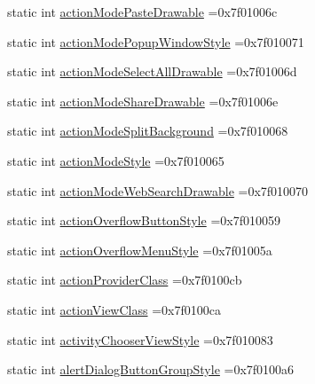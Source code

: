 \begin{DoxyCompactItemize}
static int \hyperlink{classandroid_1_1support_1_1v7_1_1cardview_1_1R_1_1attr_ac766dac9eccbe79b90d7776b8f7c2b26}{action\+Mode\+Paste\+Drawable} =0x7f01006c
\item 
static int \hyperlink{classandroid_1_1support_1_1v7_1_1cardview_1_1R_1_1attr_a5b58730faf2ff2f5aba8da289ef2570b}{action\+Mode\+Popup\+Window\+Style} =0x7f010071
\item 
static int \hyperlink{classandroid_1_1support_1_1v7_1_1cardview_1_1R_1_1attr_a3fe0b7c91a38d7caf797cc0211079d06}{action\+Mode\+Select\+All\+Drawable} =0x7f01006d
\item 
static int \hyperlink{classandroid_1_1support_1_1v7_1_1cardview_1_1R_1_1attr_aa3b0c2c648267047d5c788a1203d3e2f}{action\+Mode\+Share\+Drawable} =0x7f01006e
\item 
static int \hyperlink{classandroid_1_1support_1_1v7_1_1cardview_1_1R_1_1attr_aa4274d8662f21f4ce9f787ee5bfd927a}{action\+Mode\+Split\+Background} =0x7f010068
\item 
static int \hyperlink{classandroid_1_1support_1_1v7_1_1cardview_1_1R_1_1attr_acd95c50299a613cf031557f3da7bc3ea}{action\+Mode\+Style} =0x7f010065
\item 
static int \hyperlink{classandroid_1_1support_1_1v7_1_1cardview_1_1R_1_1attr_a97da397e6e57874c77134e0107d32083}{action\+Mode\+Web\+Search\+Drawable} =0x7f010070
\item 
static int \hyperlink{classandroid_1_1support_1_1v7_1_1cardview_1_1R_1_1attr_abfea2f33047e08b00173057b1ee9045d}{action\+Overflow\+Button\+Style} =0x7f010059
\item 
static int \hyperlink{classandroid_1_1support_1_1v7_1_1cardview_1_1R_1_1attr_a50256030a433db5bbcd0af91e846f686}{action\+Overflow\+Menu\+Style} =0x7f01005a
\item 
static int \hyperlink{classandroid_1_1support_1_1v7_1_1cardview_1_1R_1_1attr_a51040471b6842ab489279352458c9b21}{action\+Provider\+Class} =0x7f0100cb
\item 
static int \hyperlink{classandroid_1_1support_1_1v7_1_1cardview_1_1R_1_1attr_ad68d1808a3fbd15f5824cff01263ba9e}{action\+View\+Class} =0x7f0100ca
\item 
static int \hyperlink{classandroid_1_1support_1_1v7_1_1cardview_1_1R_1_1attr_a7807051f48f250aef8e6742672cc4ef7}{activity\+Chooser\+View\+Style} =0x7f010083
\item 
static int \hyperlink{classandroid_1_1support_1_1v7_1_1cardview_1_1R_1_1attr_aa7a3375ee9b48d0c8df6ec49c72d5199}{alert\+Dialog\+Button\+Group\+Style} =0x7f0100a6
\item 

\end{DoxyCompactItemize}
